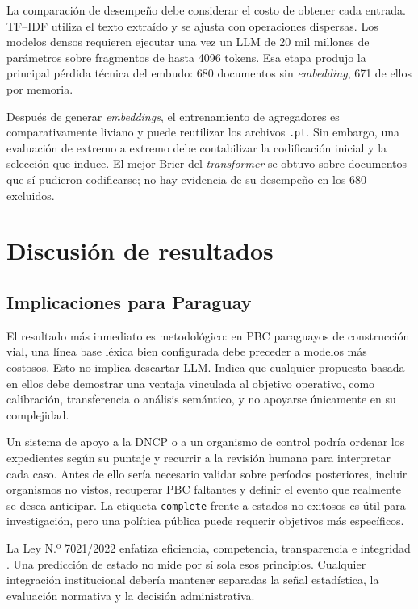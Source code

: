 La comparación de desempeño debe considerar el costo de obtener cada entrada. TF--IDF utiliza el texto extraído y se ajusta con operaciones dispersas. Los modelos densos requieren ejecutar una vez un LLM de 20 mil millones de parámetros sobre fragmentos de hasta 4096 tokens. Esa etapa produjo la principal pérdida técnica del embudo: 680 documentos sin \textit{embedding}, 671 de ellos por memoria.

Después de generar \textit{embeddings}, el entrenamiento de agregadores es comparativamente liviano y puede reutilizar los archivos \texttt{.pt}. Sin embargo, una evaluación de extremo a extremo debe contabilizar la codificación inicial y la selección que induce. El mejor Brier del \textit{transformer} se obtuvo sobre documentos que sí pudieron codificarse; no hay evidencia de su desempeño en los 680 excluidos.

\section{Discusión de resultados}



\subsection{Implicaciones para Paraguay}

El resultado más inmediato es metodológico: en PBC paraguayos de construcción vial, una línea base léxica bien configurada debe preceder a modelos más costosos. Esto no implica descartar LLM. Indica que cualquier propuesta basada en ellos debe demostrar una ventaja vinculada al objetivo operativo, como calibración, transferencia o análisis semántico, y no apoyarse únicamente en su complejidad.

Un sistema de apoyo a la DNCP o a un organismo de control podría ordenar los expedientes según su puntaje y recurrir a la revisión humana para interpretar cada caso. Antes de ello sería necesario validar sobre períodos posteriores, incluir organismos no vistos, recuperar PBC faltantes y definir el evento que realmente se desea anticipar. La etiqueta \texttt{complete} frente a estados no exitosos es útil para investigación, pero una política pública puede requerir objetivos más específicos.

La Ley N.º 7021/2022 enfatiza eficiencia, competencia, transparencia e integridad \parencite{dncpLey7021}. Una predicción de estado no mide por sí sola esos principios. Cualquier integración institucional debería mantener separadas la señal estadística, la evaluación normativa y la decisión administrativa.

